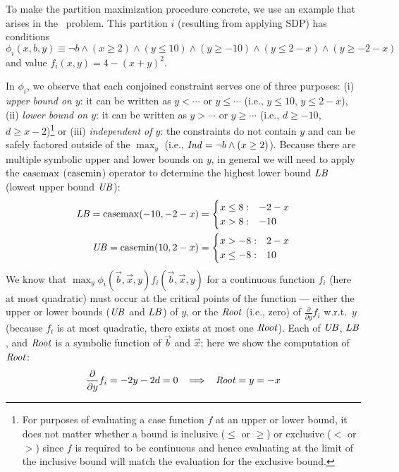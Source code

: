 To make the partition maximization procedure concrete, 
we use an example that arises in the \MarsRover\ problem.  
This partition $i$ (resulting
from applying SDP) has conditions $\phi_i(x,b,y) \equiv \neg b \wedge
(x\geq 2) \wedge (y\leq 10) \wedge (y\geq -10) \wedge (y\leq 2-x) \wedge
(y\geq -2-x)$ and value $f_i(x,y) = 4 - (x+y)^2 $.

In $\phi_i$, we observe that each conjoined constraint serves one of
three purposes: (i) \emph{upper bound on $y$}: it can be written
as $y < \cdots$ or $y \leq \cdots$ (i.e., $y \leq 10$, $y \leq 2 -
x$), (ii) \emph{lower bound on $y$}: it can be written as $y >
\cdots$ or $y \geq \cdots$ 
(i.e., $d \geq -10$, $d \geq x - 2$)\footnote{For purposes of evaluating
a case function $f$ at an upper or lower bound,
it does not matter whether a bound is inclusive ($\leq$ or $\geq$)
or exclusive ($<$ or $>$) since $f$ is required to be continuous
and hence evaluating at the limit of the inclusive bound will
match the evaluation for the exclusive bound.}
or (iii) \emph{independent of $y$}: the constraints do not contain $y$
and can be safely factored outside of the $\max_y$ (i.e., 
$\mathit{Ind} = \neg b \land (x \geq 2)$).  
Because there are multiple symbolic upper and lower
bounds on $y$, in general we will need to apply the $\mathrm{casemax}$
($\mathrm{casemin}$) operator to determine the highest lower bound $\mathit{LB}$
(lowest upper bound $\mathit{UB}$):
{\footnotesize
\begin{align*}
\mathit{LB} = \mathrm{casemax}(-10,-2 -x) & = \begin{cases}
x \leq 8: & -2 -x \\ 
x > 8: &-10\\ 
\end{cases}\\
\mathit{UB} = \mathrm{casemin}(10, 2-x) & = \begin{cases}
x > -8: & 2 -x \\ 
x \leq -8: &10\\ 
\end{cases}
\end{align*}
} We know that $\max_y \phi_i(\vec{b},\vec{x},y)
f_i(\vec{b},\vec{x},y)$ for a continuous function $f_i$ (here at most
quadratic) must occur at the critical points of the function --- 
either the upper or lower bounds ($\mathit{UB}$ and $\mathit{LB}$) of $y$, 
or the $\mathit{Root}$ (i.e., zero) of $\frac{\partial}{\partial y} f_i$ 
w.r.t.\ $y$ (because $f_i$ is at most quadratic, there exists 
at most one $\mathit{Root}$).  Each of $\mathit{UB}$, $\mathit{LB}$, and $\mathit{Root}$
is a symbolic function of $\vec{b}$ and $\vec{x}$; 
here we show the computation of $\mathit{Root}$:
{\footnotesize 
\begin{align*}
\frac{\partial}{\partial y} f_i = - 2y - 2d = 0 \;\;\; \Longrightarrow \;\;\; \mathit{Root} = y = -x
\end{align*}}

